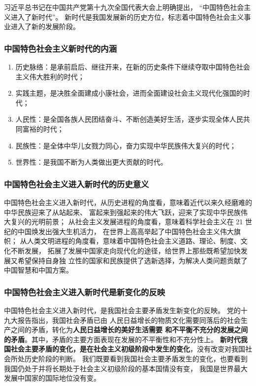 \documentclass[UTF8,10pt]{ctexbook} %
\begin{document}
习近平总书记在中国共产党第十九次全国代表大会上明确提出，
“中国特色社会主义进入了新时代”。
新时代是我国发展新的历史方位，标志着中国特色社会主义事业进入了新的发展阶段。

\subsubsection{中国特色社会主义新时代的内涵}


\begin{enumerate}[itemsep=0pt, label=\arabic*)]
    \item 历史脉络：是承前启后、继往开来，在新的历史条件下继续夺取中国特色社会主义伟大胜利的时代；
    \item 实践主题，是决胜全面建成小康社会，进而全面建设社会主义现代化强国的时代；
    \item 人民性：是全国各族人民团结奋斗、不断创造美好生活，逐步实现全体人民共同富裕的时代；
    \item 民族性：是全体中华儿女戮力同心，奋力实现中华民族伟大复兴的时代；
    \item 世界性：是我国不断为人类做出更大贡献的时代。
\end{enumerate}

\subsubsection{中国特色社会主义进入新时代的历史意义}

中国特色社会主义进入新时代，从历史进程的角度看，意味着近代以来久经磨难的中华民族迎来了从站起来、
富起来到强起来的伟大飞跃，迎来了实现中华民族伟大复兴的光明前景；
从社会主义发展进程的角度看，意味着科学社会主义在 21 世纪的中国焕发出强大生机活力，
在世界上高高举起了中国特色社会主义伟大旗帜；
从人类文明进程的角度看，意味着中国特色社会主义道路、理论、制度、文化不断发展，
拓展了发展中国家走向现代化的途径，给世界上那些既希望加快发展又希望保持自身独
立性的国家和民族提供了选新选择，为解决人类问题贡献了中国智慧和中国方案。

\subsubsection{中国特色社会主义进入新时代是新变化的反映}

中国特色社会主义进入新时代，是我国社会主要矛盾发生新变化的反映。
党的十九大报告指出，我国社会矛盾已由
人民日益增长的物质文化需要同落后的社会生产之间的矛盾，转化为\textbf{人民日益增长的美好生活需要
和不平衡不充分的发展之间的矛盾}。其中，矛盾的主要方面表现在发展的不平衡性和不充分性上。
\textbf{新时代我国社会主要矛盾的变化，是在社会主义初级阶段中发生的变化}，没有改变对我国社会所处历史阶段的判断。
我们既要看到我国社会主要矛盾发生的变化，也要看到我国仍处于并将长期处于社会主义初级阶段的基本国情没有变，
我国是世界最大发展中国家的国际地位没有变。
\end{document}
